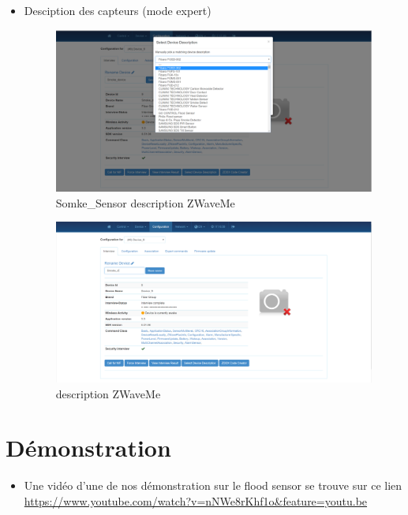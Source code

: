 \begin{itemize}
\item Desciption des capteurs (mode expert)

\begin{figure}[h]
	\center
\includegraphics[scale=0.4]{./Images/png/smoke_description_zwaveme.png}
	\caption{Somke\_Sensor description ZWaveMe}
\end{figure}
\clearpage

\begin{figure}[h]
	\center
\includegraphics[scale=0.4]{./Images/png/description_zwaveme.png}	\caption{description ZWaveMe}
\end{figure}
\clearpage

\end{itemize}


\section{Démonstration}
\begin{itemize}
	\item Une vidéo d'une de nos démonstration sur le flood sensor se trouve sur ce lien
	 \url{https://www.youtube.com/watch?v=nNWe8rKhf1o&feature=youtu.be}
\end{itemize}

